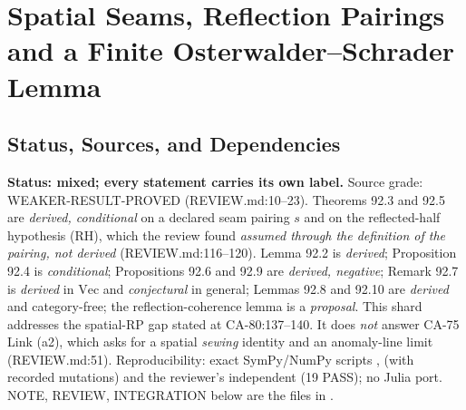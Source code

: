 
\section{Spatial Seams, Reflection Pairings and a Finite Osterwalder--Schrader Lemma}
\label{sec:spatial-seams-reflection-positivity}

\subsection{Status, Sources, and Dependencies}

\textbf{Status: mixed; every statement carries its own label.}  Source grade: WEAKER-RESULT-PROVED (REVIEW.md:10--23).
Theorems 92.3 and 92.5 are \emph{derived, conditional} on a declared seam pairing \(s\) and on the reflected-half
hypothesis (RH), which the review found \emph{assumed through the definition of the pairing, not derived}
(REVIEW.md:116--120).  Lemma 92.2 is \emph{derived}; Proposition 92.4 is \emph{conditional}; Propositions 92.6 and
92.9 are \emph{derived, negative}; Remark 92.7 is \emph{derived} in \(\mathrm{Vec}\) and \emph{conjectural} in general;
Lemmas 92.8 and 92.10 are \emph{derived} and category-free; the reflection-coherence lemma is a \emph{proposal}.
This shard addresses the spatial-RP gap stated at CA-80:137--140.  It does \emph{not} answer CA-75 Link (a2), which
asks for a spatial \emph{sewing} identity and an anomaly-line limit (REVIEW.md:51).  Reproducibility: exact
SymPy/NumPy scripts ,  (with recorded mutations) and the
reviewer's independent  (19 PASS); no Julia port.  NOTE, REVIEW, INTEGRATION below
are the files in .

